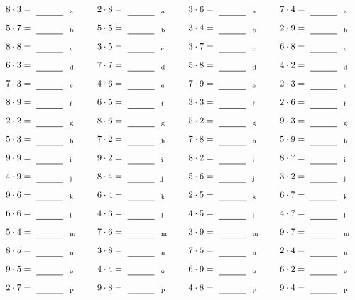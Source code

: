 \documentclass
[
  draft    = true,
  fontsize = 11pt,
  parskip  = half-
]
{scrartcl}
\begin{document}
\par\vfill\par
\begin{align*}
    \pline{8\cdot3}&=\rline{a}
  & \pline{2\cdot8}&=\rline{a}
  & \pline{3\cdot6}&=\rline{a}
  & \pline{7\cdot4}&=\rline{a} \\[1ex]
    \pline{5\cdot7}&=\rline{b}
  & \pline{5\cdot5}&=\rline{b}
  & \pline{3\cdot4}&=\rline{b}
  & \pline{2\cdot9}&=\rline{b} \\[1ex]
    \pline{8\cdot8}&=\rline{c}
  & \pline{3\cdot5}&=\rline{c}
  & \pline{3\cdot7}&=\rline{c}
  & \pline{6\cdot8}&=\rline{c} \\[1ex]
    \pline{6\cdot3}&=\rline{d}
  & \pline{7\cdot7}&=\rline{d}
  & \pline{5\cdot8}&=\rline{d}
  & \pline{4\cdot2}&=\rline{d} \\[1ex]
    \pline{7\cdot3}&=\rline{e}
  & \pline{4\cdot6}&=\rline{e}
  & \pline{7\cdot9}&=\rline{e}
  & \pline{2\cdot3}&=\rline{e} \\[1ex]
    \pline{8\cdot9}&=\rline{f}
  & \pline{6\cdot5}&=\rline{f}
  & \pline{3\cdot3}&=\rline{f}
  & \pline{2\cdot6}&=\rline{f} \\[1ex]
    \pline{2\cdot2}&=\rline{g}
  & \pline{8\cdot6}&=\rline{g}
  & \pline{5\cdot2}&=\rline{g}
  & \pline{9\cdot3}&=\rline{g} \\[1ex]
    \pline{5\cdot3}&=\rline{h}
  & \pline{7\cdot2}&=\rline{h}
  & \pline{7\cdot8}&=\rline{h}
  & \pline{5\cdot9}&=\rline{h} \\[1ex]
    \pline{9\cdot9}&=\rline{i}
  & \pline{9\cdot2}&=\rline{i}
  & \pline{8\cdot2}&=\rline{i}
  & \pline{8\cdot7}&=\rline{i} \\[1ex]
    \pline{4\cdot9}&=\rline{j}
  & \pline{8\cdot4}&=\rline{j}
  & \pline{5\cdot6}&=\rline{j}
  & \pline{3\cdot2}&=\rline{j} \\[1ex]
    \pline{9\cdot6}&=\rline{k}
  & \pline{6\cdot4}&=\rline{k}
  & \pline{2\cdot5}&=\rline{k}
  & \pline{6\cdot7}&=\rline{k} \\[1ex]
    \pline{6\cdot6}&=\rline{l}
  & \pline{4\cdot3}&=\rline{l}
  & \pline{4\cdot5}&=\rline{l}
  & \pline{4\cdot7}&=\rline{l} \\[1ex]
    \pline{5\cdot4}&=\rline{m}
  & \pline{7\cdot6}&=\rline{m}
  & \pline{3\cdot9}&=\rline{m}
  & \pline{9\cdot7}&=\rline{m} \\[1ex]
    \pline{8\cdot5}&=\rline{n}
  & \pline{3\cdot8}&=\rline{n}
  & \pline{7\cdot5}&=\rline{n}
  & \pline{2\cdot4}&=\rline{n} \\[1ex]
    \pline{9\cdot5}&=\rline{o}
  & \pline{4\cdot4}&=\rline{o}
  & \pline{6\cdot9}&=\rline{o}
  & \pline{6\cdot2}&=\rline{o} \\[1ex]
    \pline{2\cdot7}&=\rline{p}
  & \pline{9\cdot8}&=\rline{p}
  & \pline{4\cdot8}&=\rline{p}
  & \pline{9\cdot4}&=\rline{p}
\end{align*}
\end{document}
